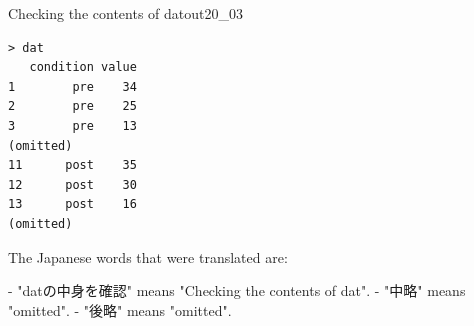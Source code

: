 \begin{Rscreen}{Checking the contents of dat}{out20_03}
	\begin{verbatim}
> dat
   condition value
1        pre    34
2        pre    25
3        pre    13
(omitted)
11      post    35
12      post    30
13      post    16
(omitted)
\end{verbatim}
\end{Rscreen}

The Japanese words that were translated are:

- "datの中身を確認" means "Checking the contents of dat".
- "中略" means "omitted".
- "後略" means "omitted".
